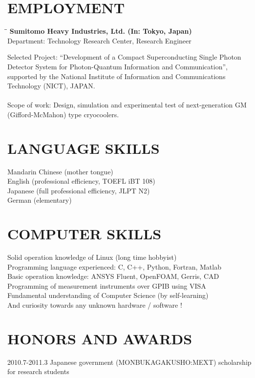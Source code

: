 \documentclass[12pt,A4]{res}
\makeatletter
\newlength\tdima
\newcommand\tabright[1]{%
      \setlength\tdima{\linewidth}%
      \addtolength\tdima{\@totalleftmargin}%
      \addtolength\tdima{-\dimen\@curtab}%
      \makebox[\tdima][r]{#1}}
\makeatother
\begin{document}
\begin{resume}
\section{EMPLOYMENT}
    \vspace{-0.1in}	    
    \begin{tabbing}
    \hspace{2.2in}\= \hspace{2.1in}\= \kill %
    {\bf Sumitomo Heavy Industries, Ltd. (In: Tokyo, Japan)} \> \tabright{2013.4-Present} \\
    Department: Technology Research Center, Research Engineer \\
   \end{tabbing}\vspace{-20pt}      %

    Selected Project: “Development of a Compact Superconducting Single Photon
    Detector System for Photon-Quantum Information and Communication”, supported by
    the National Institute of Information and Communications Technology (NICT), JAPAN. \\
    \\
    Scope of work: Design, simulation and experimental test of next-generation GM (Gifford-McMahon) type cryocoolers.\\   
     
\section{LANGUAGE SKILLS}
Mandarin Chinese (mother tongue) \\
English (professional efficiency, TOEFL iBT 108) \\
Japanese (full professional efficiency, JLPT N2) \\
German (elementary)     

\section{COMPUTER SKILLS}          
Solid operation knowledge of Linux (long time hobbyist) \\
Programming language experienced: C, C++, Python, Fortran, Matlab \\
Basic operation knowledge: ANSYS Fluent, OpenFOAM, Gerris, CAD \\
Programming of measurement instruments over GPIB using VISA \\
Fundamental understanding of Computer Science (by self-learning) \\
And curiosity towards any unknown hardware / software !
 
\section{HONORS AND AWARDS}          
2010.7-2011.3 Japanese government (MONBUKAGAKUSHO:MEXT) scholarship for research students\\

\end{resume}
\end{document}
